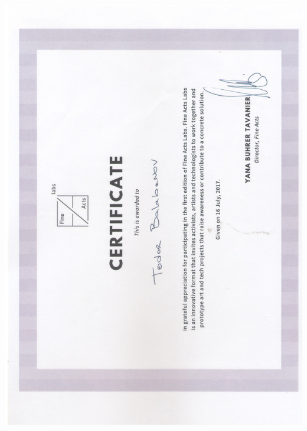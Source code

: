 \documentclass[english,a4paper]{europasscv}
\begin{document}
\includegraphics[width=\textwidth,height=\textheight,keepaspectratio]{FineActsLabs2017}
\end{document}

